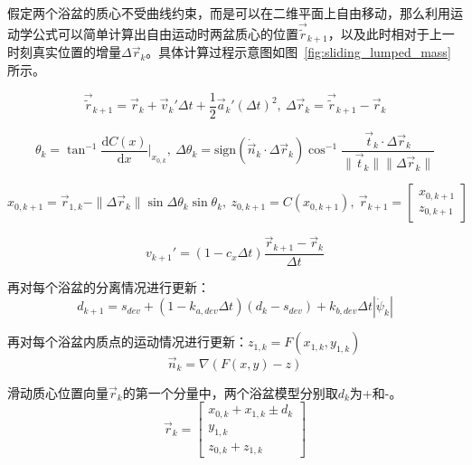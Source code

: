             假定两个浴盆的质心不受曲线约束，而是可以在二维平面上自由移动，那么利用运动学公式可以简单计算出自由运动时两盆质心的位置$\vec{\tilde{r}}_{k+1}$，以及此时相对于上一时刻真实位置的增量$\Delta \vec{r}_k$。具体计算过程示意图如图~\ref{fig:sliding_lumped_mass}所示。

            \begin{equation}
            \vec{\tilde{r}}_{k+1} = \vec{r}_k + \vec{v}_k' \Delta t + \frac{1}{2} \vec{a}_k' (\Delta t)^2, ~\Delta \vec{r}_k = \vec{\tilde{r}}_{k+1} - \vec{r}_k
            \end{equation}

            \begin{equation}
            \theta_k = \tan^{-1} \frac{\mathrm{d}C(x)}{\mathrm{d}x}\bigg|_{x_{0,k}}, ~
            \Delta \theta_k = \mathrm{sign}(\dot{\vec{n}}_k \cdot \Delta \vec{r}_k) \cos^{-1} \frac{\vec{t}_k \cdot \Delta \vec{r}_k}{\|\vec{t}_k\| \|\Delta \vec{r}_k\|}
            \end{equation}

            \begin{equation}
            x_{0,k+1} = \vec{r}_{1,k} - \|\Delta \vec{r}_k\| \sin \Delta \theta_k \sin \theta_k,~
            z_{0,k+1} = C(x_{0,k+1}) ,~ \vec{r}_{k+1} = \begin{bmatrix} x_{0,k+1} \\ z_{0,k+1} \end{bmatrix}
            \end{equation}

            \begin{equation}
            v_{k+1}' = (1 - c_x \Delta t) \frac{\vec{r}_{k+1} - \vec{r}_k}{\Delta t}
            \end{equation}

            再对每个浴盆的分离情况进行更新：
            \begin{equation}
            d_{k+1} = s_{dev} + (1 - k_{a,dev} \Delta t)(d_k - s_{dev}) + k_{b,dev} \Delta t |\dot{\psi}_k|
            \label{eq:d_dev}
            \end{equation}

            再对每个浴盆内质点的运动情况进行更新：$z_{1,k} = F(x_{1,k}, y_{1,k})$
            \begin{equation}
            \vec{n}_k = \nabla(F(x,y) - z)
            \end{equation}

            滑动质心位置向量$\vec{r}_k$的第一个分量中，两个浴盆模型分别取$d_k$为+和-。
            \begin{equation}
            \vec{r}_k = \begin{bmatrix} x_{0,k} + x_{1,k} \pm d_k \\ y_{1,k} \\ z_{0,k} + z_{1,k} \end{bmatrix}
            \label{eq:stl_state_prime}
            \end{equation}

